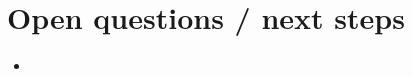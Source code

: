 \documentclass[12pt]{article}
\theoremstyle{remark}
\begin{document}
\section{Open questions / next steps}
\begin{itemize}
  \item
\end{itemize}



\end{document}
